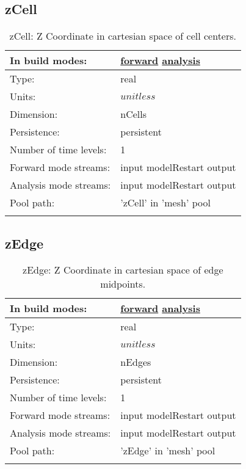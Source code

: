 \subsection[zCell]{zCell}
\label{subsec:var_sec_mesh_zCell}
\begin{center}
\begin{longtable}{| p{2.0in} | p{4.0in} |}
        \hline 
        In build modes: & \hyperref[subsec:forward_var_tab_mesh]{forward} \hyperref[subsec:analysis_var_tab_mesh]{analysis} \\
        \hline 
        Type: & real \\
        \hline 
        Units: & $unitless$ \\
        \hline 
        Dimension: & nCells \\
        \hline 
        Persistence: & persistent \\
        \hline 
        Number of time levels: & 1 \\
        \hline 
		 Forward mode streams: &  input modelRestart output \\
        \hline 
		 Analysis mode streams: &  input modelRestart output \\
        \hline 
            Pool path: & 'zCell' in 'mesh' pool
 \\
		 \hline 
    \caption{zCell: Z Coordinate in cartesian space of cell centers.}
\end{longtable}
\end{center}
\subsection[zEdge]{zEdge}
\label{subsec:var_sec_mesh_zEdge}
\begin{center}
\begin{longtable}{| p{2.0in} | p{4.0in} |}
        \hline 
        In build modes: & \hyperref[subsec:forward_var_tab_mesh]{forward} \hyperref[subsec:analysis_var_tab_mesh]{analysis} \\
        \hline 
        Type: & real \\
        \hline 
        Units: & $unitless$ \\
        \hline 
        Dimension: & nEdges \\
        \hline 
        Persistence: & persistent \\
        \hline 
        Number of time levels: & 1 \\
        \hline 
		 Forward mode streams: &  input modelRestart output \\
        \hline 
		 Analysis mode streams: &  input modelRestart output \\
        \hline 
            Pool path: & 'zEdge' in 'mesh' pool
 \\
		 \hline 
    \caption{zEdge: Z Coordinate in cartesian space of edge midpoints.}
\end{longtable}
\end{center}
